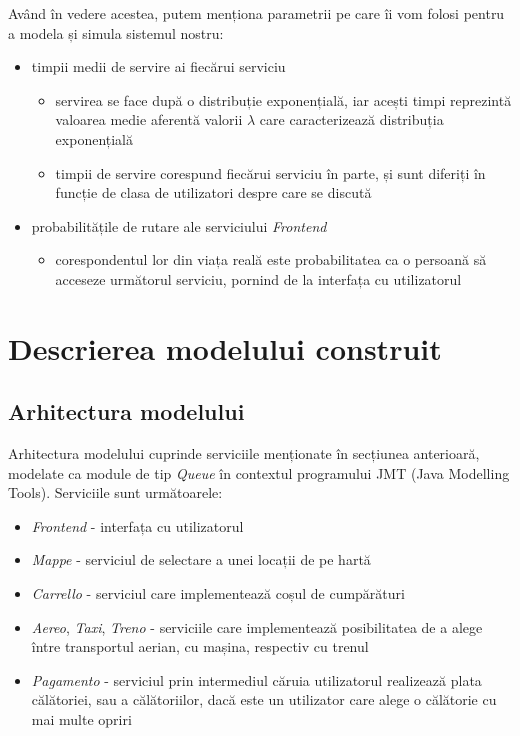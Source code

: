 \documentclass[12pt]{article}
\begin{document}
            Având în vedere acestea, putem menționa parametrii pe care îi vom folosi pentru a modela și simula sistemul nostru:
            \begin{itemize}
                \item{timpii medii de servire ai fiecărui serviciu}
                    \begin{itemize}
                        \item{servirea se face după o distribuție exponențială, iar acești timpi reprezintă valoarea medie aferentă valorii $\lambda$ care caracterizează distribuția exponențială}
                        \item{timpii de servire corespund fiecărui serviciu în parte, și sunt diferiți în funcție de clasa de utilizatori despre care se discută}
                    \end{itemize}
                \item{probabilitățile de rutare ale serviciului \textit{Frontend}}
                    \begin{itemize}
                        \item{corespondentul lor din viața reală este probabilitatea ca o persoană să acceseze următorul serviciu, pornind de la interfața cu utilizatorul}
                    \end{itemize}
            \end{itemize}
            \pagebreak


    \section{Descrierea modelului construit}

        \subsection{Arhitectura modelului}
            Arhitectura modelului cuprinde serviciile menționate în secțiunea anterioară, modelate ca module de tip \textit{Queue} în contextul programului JMT (Java Modelling Tools). Serviciile sunt următoarele:

            \begin{itemize}
                \itemsep0em
                \item{\textit{Frontend} - interfața cu utilizatorul}
                \item{\textit{Mappe} - serviciul de selectare a unei locații de pe hartă}
                \item{\textit{Carrello} - serviciul care implementează coșul de cumpărături}
                \item{\textit{Aereo}, \textit{Taxi}, \textit{Treno} - serviciile care implementează posibilitatea de a alege între transportul aerian, cu mașina, respectiv cu trenul}
                \item{\textit{Pagamento} - serviciul prin intermediul căruia utilizatorul realizează plata călătoriei, sau a călătoriilor, dacă este un utilizator care alege o călătorie cu mai multe opriri}
            \end{itemize}
\end{document}
